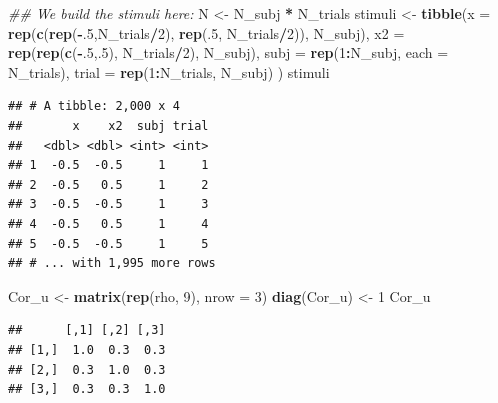 \documentclass[12pt,]{krantz}
\newenvironment{Shaded}{\begin{snugshade}}{\end{snugshade}}
\newcommand{\CommentTok}[1]{\textcolor[rgb]{0.56,0.35,0.01}{\textit{#1}}}
\newcommand{\DataTypeTok}[1]{\textcolor[rgb]{0.13,0.29,0.53}{#1}}
\newcommand{\DecValTok}[1]{\textcolor[rgb]{0.00,0.00,0.81}{#1}}
\newcommand{\KeywordTok}[1]{\textcolor[rgb]{0.13,0.29,0.53}{\textbf{#1}}}
\newcommand{\NormalTok}[1]{#1}
\newcommand{\OperatorTok}[1]{\textcolor[rgb]{0.81,0.36,0.00}{\textbf{#1}}}
\newcommand{\StringTok}[1]{\textcolor[rgb]{0.31,0.60,0.02}{#1}}
\theoremstyle{definition}
\theoremstyle{definition}
\theoremstyle{definition}
\theoremstyle{remark}
\begin{document}
\begin{Shaded}
\begin{Highlighting}[]
\CommentTok{## We build the stimuli here:}
\NormalTok{N <-}\StringTok{ }\NormalTok{N_subj }\OperatorTok{*}\StringTok{ }\NormalTok{N_trials}
\NormalTok{stimuli <-}\StringTok{ }\KeywordTok{tibble}\NormalTok{(}\DataTypeTok{x =} \KeywordTok{rep}\NormalTok{(}\KeywordTok{c}\NormalTok{(}\KeywordTok{rep}\NormalTok{(}\OperatorTok{-}\NormalTok{.}\DecValTok{5}\NormalTok{,N_trials}\OperatorTok{/}\DecValTok{2}\NormalTok{), }\KeywordTok{rep}\NormalTok{(.}\DecValTok{5}\NormalTok{, N_trials}\OperatorTok{/}\DecValTok{2}\NormalTok{)), N_subj),}
                  \DataTypeTok{x2 =} \KeywordTok{rep}\NormalTok{(}\KeywordTok{rep}\NormalTok{(}\KeywordTok{c}\NormalTok{(}\OperatorTok{-}\NormalTok{.}\DecValTok{5}\NormalTok{,.}\DecValTok{5}\NormalTok{), N_trials}\OperatorTok{/}\DecValTok{2}\NormalTok{), N_subj),}
                  \DataTypeTok{subj =} \KeywordTok{rep}\NormalTok{(}\DecValTok{1}\OperatorTok{:}\NormalTok{N_subj, }\DataTypeTok{each =}\NormalTok{ N_trials),}
                  \DataTypeTok{trial =} \KeywordTok{rep}\NormalTok{(}\DecValTok{1}\OperatorTok{:}\NormalTok{N_trials, N_subj)}
\NormalTok{                  )}
\NormalTok{stimuli}
\end{Highlighting}
\end{Shaded}

\begin{verbatim}
## # A tibble: 2,000 x 4
##       x    x2  subj trial
##   <dbl> <dbl> <int> <int>
## 1  -0.5  -0.5     1     1
## 2  -0.5   0.5     1     2
## 3  -0.5  -0.5     1     3
## 4  -0.5   0.5     1     4
## 5  -0.5  -0.5     1     5
## # ... with 1,995 more rows
\end{verbatim}

\begin{Shaded}
\begin{Highlighting}[]
\NormalTok{Cor_u <-}\StringTok{ }\KeywordTok{matrix}\NormalTok{(}\KeywordTok{rep}\NormalTok{(rho, }\DecValTok{9}\NormalTok{), }\DataTypeTok{nrow =} \DecValTok{3}\NormalTok{)}
\KeywordTok{diag}\NormalTok{(Cor_u) <-}\StringTok{ }\DecValTok{1}
\NormalTok{Cor_u}
\end{Highlighting}
\end{Shaded}

\begin{verbatim}
##      [,1] [,2] [,3]
## [1,]  1.0  0.3  0.3
## [2,]  0.3  1.0  0.3
## [3,]  0.3  0.3  1.0
\end{verbatim}
\end{document}
